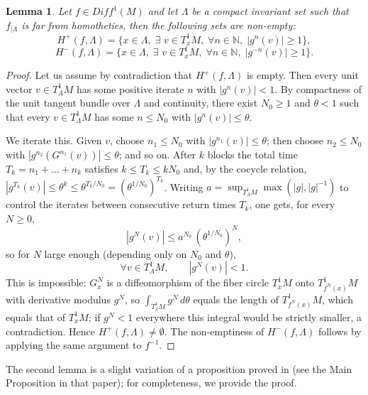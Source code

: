 \documentclass[a4paper,11pt]{article}
\newtheorem{lemma}{Lemma}
\theoremstyle{definition}
\def\NN{{\mathbb N}}
\def\La{\Lambda}
\def\La{\Lambda}
\begin{document}
\begin{lemma}\label{l.H}  Let $f\in Diff^1(M)$ and let $\Lambda$ be a compact invariant set such that $f_{|\La}$ is far from homotheties, then the following sets are non-empty:
$$H^+(f,\Lambda)=\{x\in\Lambda, \; \exists \,\,v\in T_x^1M,\;
\forall n\in \NN, \; |g^{n}(v)|\geq 1\},$$
$$H^-(f,\Lambda)=\{x\in\Lambda, \; \exists\,\, v\in T_x^1M,\;
\forall n\in \NN, \; |g^{-n}(v)|\geq 1\}.$$
\end{lemma}
\begin{proof}
Let us assume by contradiction that $H^+(f,\Lambda)$ is empty. Then every
unit vector $v\in T^1_\Lambda M$ has some positive iterate $n$ with
$|g^{n}(v)|<1$. By compactness of the unit tangent bundle over $\Lambda$
and continuity, there exist $N_0\geq 1$ and $\theta<1$ such that every
$v\in T^1_\Lambda M$ has some $n\leq N_0$ with $|g^{n}(v)|\leq\theta$.

We iterate this. Given $v$, choose $n_1\leq N_0$ with
$|g^{n_1}(v)|\leq\theta$; then choose $n_2\leq N_0$ with
$|g^{n_2}(G^{n_1}(v))|\leq\theta$; and so on. After $k$ blocks the total
time $T_k=n_1+\dots+n_k$ satisfies $k\leq T_k\leq kN_0$ and, by the cocycle
relation, $|g^{T_k}(v)|\leq\theta^{k}\leq\theta^{T_k/N_0}=(\theta^{1/N_0})^{T_k}$.
Writing $a=\sup_{T^1_\Lambda M}\max(|g|,|g|^{-1})$ to control the iterates
between consecutive return times $T_k$, one gets, for every $N\geq 0$,
$$|g^{N}(v)|\leq a^{N_0}\,(\theta^{1/N_0})^{N},$$
so for $N$ large enough (depending only on $N_0$ and $\theta$),
$$\forall v\in T^1_\Lambda M,\qquad |g^{N}(v)|<1.$$
This is impossible: $G^{N}_x$ is a diffeomorphism of the fiber circle
$T^1_xM$ onto $T^1_{f^{N}(x)}M$ with derivative modulus $g^{N}$, so
$\int_{T^1_xM} g^{N}\,d\theta$ equals the length of $T^1_{f^{N}(x)}M$, which
equals that of $T^1_xM$; if $g^{N}<1$ everywhere this integral would be
strictly smaller, a contradiction. Hence $H^+(f,\Lambda)\neq\emptyset$. The
non-emptiness of $H^-(f,\Lambda)$ follows by applying the same argument to
$f^{-1}$.
\end{proof}
\bigskip
The second lemma is a slight variation of a proposition  proved in \cite{PRH} (see the Main Proposition in that paper); for completeness, we provide the proof.
\end{document}
